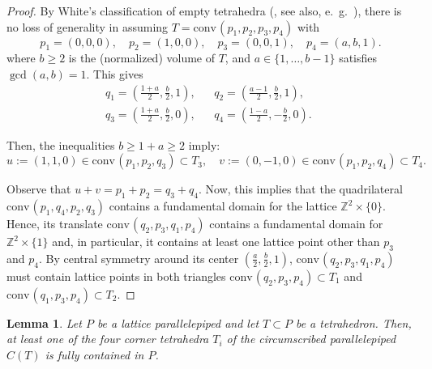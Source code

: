 \documentclass{amsart}
\theoremstyle{plain}
\newtheorem{lemma}[theorem]{Lemma}
\theoremstyle{definition}
\newcommand{\Z}{ \ensuremath{\mathbb{Z}}}
\newcommand{\conv}{\ensuremath{\mathrm{conv}}\hspace{1pt}}
\begin{document}
\begin{proof}
By White's classification of empty tetrahedra (\cite{White1964}, see also, e.~g.~\cite[Sect.~4.1]{HPPS-survey}), there is no loss of generality in assuming $T=\conv(p_1,p_2,p_3,p_4)$ with
\[
p_1=(0,0,0), \quad
p_2=(1,0,0), \quad
p_3=(0,0,1), \quad
p_4=(a,b,1).
\]
where $b\ge 2$ is the (normalized) volume of $T$, and $a\in \{1,\dots,b-1\}$ satisfies $\gcd(a,b)=1$. This gives 
\begin{align*}
q_1=\left(\frac{1+a}2,\frac{b}2,1\right), &&
q_2=\left(\frac{a-1}2,\frac{b}2,1\right), \quad\\
q_3=\left(\frac{1+a}2,\frac{b}2,0\right), &&
q_4=\left(\frac{1-a}2,-\frac{b}2,0\right).
\end{align*}

Then, the inequalities $b\ge 1+a \ge 2$ imply:
\[
u:=(1,1,0)\in \conv(p_1,p_2,q_3) \subset T_3, \quad
v:=(0,-1,0)\in \conv(p_1,p_2,q_4) \subset T_4.
\]

Observe that $u+v=p_1+p_2=q_3+q_4$.
Now, this implies that the quadrilateral $\conv(p_1,q_4,p_2,q_3)$ contains a fundamental domain for the lattice $\Z^2\times\{0\}$. Hence, its translate $\conv(q_2,p_3,q_1,p_4)$ contains a fundamental domain for $\Z^2\times\{1\}$ and, in particular, it contains at least one lattice point other than $p_3$ and $p_4$. By central symmetry around its center $\left(\frac{a}2,\frac{b}2,1\right)$, $\conv(q_2,p_3,q_1,p_4)$ must contain lattice points in both triangles $\conv(q_2,p_3,p_4)\subset T_1$ and $\conv(q_1,p_3,p_4)\subset T_2$.

\end{proof}


\begin{lemma}
\label{lemma:3<4}
Let $P$ be a lattice parallelepiped and let $T\subset P$ be a tetrahedron. Then, at least one of the four corner tetrahedra $T_i$ of the circumscribed parallelepiped $C(T)$ is fully contained in $P$.
\end{lemma}
\end{document}
